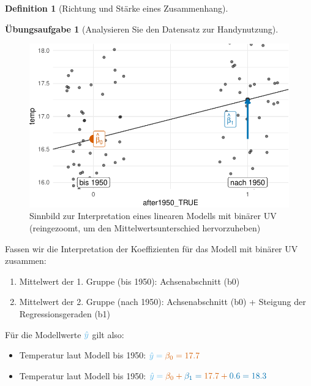 \documentclass[
  a4paper,
  DIV=11]{scrreprt}
\providecommand{\tightlist}{%
  \setlength{\itemsep}{0pt}\setlength{\parskip}{0pt}}\usepackage{longtable,booktabs,array}
\theoremstyle{definition}
\newtheorem{exercise}{Übungsaufgabe}[chapter]
\theoremstyle{definition}
\theoremstyle{definition}
\newtheorem{definition}{Definition}[chapter]
\theoremstyle{remark}
\begin{document}
\begin{definition}[Richtung und Stärke eines
Zusammenhang]
\begin{exercise}[Analysieren Sie den Datensatz zur
Handynutzung]
\begin{figure}
{\includegraphics{090-regression2_files/figure-pdf/fig-binvar-1.pdf}

}

\caption{\label{fig-binvar}Sinnbild zur Interpretation eines linearen
Modells mit binärer UV (reingezoomt, um den Mittelwertsunterschied
hervorzuheben)}

\end{figure}%

Fassen wir die Interpretation der Koeffizienten für das Modell mit
binärer UV zusammen:

\begin{enumerate}
\def\labelenumi{\arabic{enumi}.}
\tightlist
\item
  Mittelwert der 1. Gruppe (bis 1950): {Achsenabschnitt (b0)}
\item
  Mittelwert der 2. Gruppe (nach 1950): {Achsenabschnitt (b0)} +
  {Steigung der Regressionsgeraden (b1)}
\end{enumerate}

Für die Modellwerte \(\color{modelcol}{\hat{y}}\) gilt also:

\begin{itemize}
\item
  Temperatur laut Modell bis 1950:
  \(\color{modelcol}{\hat{y}} = \color{beta0col}{\beta_0} = 17.7\)
\item
  Temperatur laut Modell bis 1950:
  \(\color{modelcol}{\hat{y}} = \color{beta0col}{\beta_0} +  \color{beta1col}{\beta_1}= \color{beta0col}{17.7} + \color{beta1col}{0.6} = 18.3\)
\end{itemize}

\begin{tcolorbox}[enhanced jigsaw, leftrule=.75mm, opacitybacktitle=0.6, colback=white, colframe=quarto-callout-note-color-frame, coltitle=black, colbacktitle=quarto-callout-note-color!10!white, opacityback=0, left=2mm, breakable, titlerule=0mm, toptitle=1mm, bottomtitle=1mm, rightrule=.15mm, title=\textcolor{quarto-callout-note-color}{\faInfo}\hspace{0.5em}{Hinweis}, arc=.35mm, bottomrule=.15mm, toprule=.15mm]


\end{tcolorbox}
\end{exercise}
\end{definition}
\end{document}
